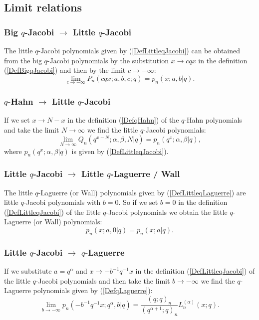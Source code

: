 \documentclass[envcountchap,graybox]{svmono}
\newcounter{rom}
\begin{document}
\subsection*{Limit relations}

\subsubsection*{Big $q$-Jacobi $\rightarrow$ Little $q$-Jacobi}
The little $q$-Jacobi polynomials given by (\ref{DefLittleqJacobi}) can be obtained
from the big $q$-Jacobi polynomials by the substitution $x\rightarrow cqx$ in the definition
(\ref{DefBigqJacobi}) and then by the limit $c\rightarrow -\infty$:
$$\lim_{c\rightarrow -\infty}P_n(cqx;a,b,c;q)=p_n(x;a,b|q).$$

\subsubsection*{$q$-Hahn $\rightarrow$ Little $q$-Jacobi}
If we set $x\rightarrow N-x$ in the definition (\ref{DefqHahn}) of the $q$-Hahn
polynomials and take the limit $N\rightarrow\infty$ we find the little $q$-Jacobi polynomials:
$$\lim _{N\rightarrow\infty} Q_n(q^{x-N};\alpha,\beta,N|q)=p_n(q^x;\alpha,\beta|q),$$
where $p_n(q^x;\alpha,\beta|q)$ is given by (\ref{DefLittleqJacobi}).

\subsubsection*{Little $q$-Jacobi $\rightarrow$ Little $q$-Laguerre / Wall}
The little $q$-Laguerre (or Wall) polynomials given by (\ref{DefLittleqLaguerre})
are little $q$-Jacobi polynomials with $b=0$. So if we set $b=0$ in the
definition (\ref{DefLittleqJacobi}) of the little $q$-Jacobi polynomials we
obtain the little $q$-Laguerre (or Wall) polynomials:
\begin{equation}
p_n(x;a,0|q)=p_n(x;a|q).
\end{equation}

\subsubsection*{Little $q$-Jacobi $\rightarrow$ $q$-Laguerre}
If we substitute $a=q^{\alpha}$ and $x\rightarrow -b^{-1}q^{-1}x$ in the definition
(\ref{DefLittleqJacobi}) of the little $q$-Jacobi polynomials and then take the limit
$b\rightarrow -\infty$ we find the $q$-Laguerre polynomials given by (\ref{DefqLaguerre}):
\begin{equation}
\lim_{b\rightarrow -\infty}p_n(-b^{-1}q^{-1}x;q^{\alpha},b|q)=
\frac{(q;q)_n}{(q^{\alpha+1};q)_n}L_n^{(\alpha)}(x;q).
\end{equation}
\end{document}
